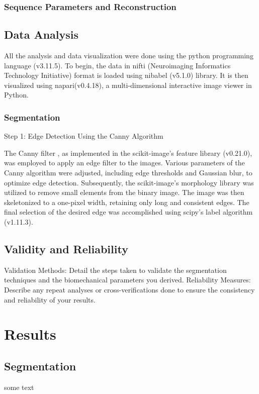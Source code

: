 \documentclass{micro-econ-thesis}
\begin{document}
\subsubsection{Sequence Parameters and Reconstruction}


\subsection{Data Analysis}
All the analysis and data visualization were done using the python programming language (v3.11.5). To begin, the data in nifti (Neuroimaging Informatics Technology Initiative) format is loaded using nibabel (v5.1.0) library. It is then visualized using napari(v0.4.18), a multi-dimensional interactive image viewer in Python. 
\subsubsection{Segmentation}
Step 1: Edge Detection Using the Canny Algorithm

The Canny filter \parencite{canny_computational_1986}, as implemented in the scikit-image's feature library (v0.21.0), was employed to apply an edge filter to the images. Various parameters of the Canny algorithm were adjusted, including edge thresholds and Gaussian blur, to optimize edge detection. Subsequently, the scikit-image's morphology library was utilized to remove small elements from the binary image. The image was then skeletonized to a one-pixel width, retaining only long and consistent edges. The final selection of the desired edge was accomplished using scipy's label algorithm (v1.11.3).

\subsection{Validity and Reliability}
Validation Methods: Detail the steps taken to validate the segmentation techniques and the biomechanical parameters you derived.
Reliability Measures: Describe any repeat analyses or cross-verifications done to ensure the consistency and reliability of your results.

\section{Results}
\label{sec:yetanother}

\subsection{Segmentation}
\label{subsec:last}
some text 
\end{document}
